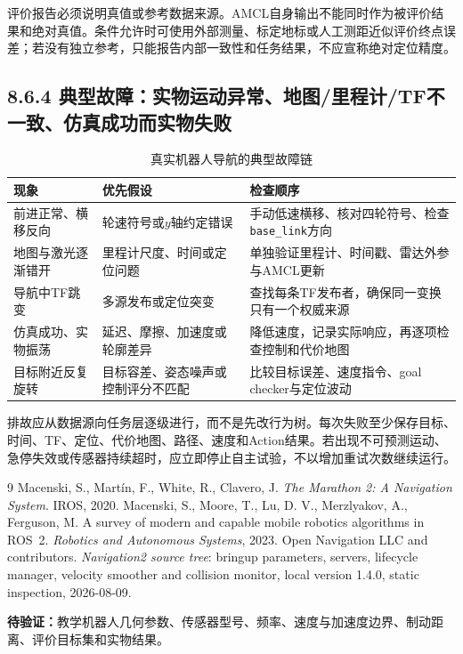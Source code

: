 \documentclass[UTF8,zihao=-4]{ctexart}
\begin{document}
评价报告必须说明真值或参考数据来源。AMCL自身输出不能同时作为被评价结果和绝对真值。条件允许时可使用外部测量、标定地标或人工测距近似评价终点误差；若没有独立参考，只能报告内部一致性和任务结果，不应宣称绝对定位精度。

\subsection*{8.6.4 典型故障：实物运动异常、地图/里程计/TF不一致、仿真成功而实物失败}

\begin{table}[htbp]
  \centering
  \caption{真实机器人导航的典型故障链}
  \begin{tabular}{p{}p{}p{}}
    \toprule
    现象 & 优先假设 & 检查顺序 \\
    \midrule
    前进正常、横移反向 & 轮速符号或$y$轴约定错误 & 手动低速横移、核对四轮符号、检查\texttt{base\_link}方向 \\
    地图与激光逐渐错开 & 里程计尺度、时间或定位问题 & 单独验证里程计、时间戳、雷达外参与AMCL更新 \\
    导航中TF跳变 & 多源发布或定位突变 & 查找每条TF发布者，确保同一变换只有一个权威来源 \\
    仿真成功、实物振荡 & 延迟、摩擦、加速度或轮廓差异 & 降低速度，记录实际响应，再逐项检查控制和代价地图 \\
    目标附近反复旋转 & 目标容差、姿态噪声或控制评分不匹配 & 比较目标误差、速度指令、goal checker与定位波动 \\
    \bottomrule
  \end{tabular}
\end{table}

排故应从数据源向任务层逐级进行，而不是先改行为树。每次失败至少保存目标、时间、TF、定位、代价地图、路径、速度和Action结果。若出现不可预测运动、急停失效或传感器持续超时，应立即停止自主试验，不以增加重试次数继续运行。

\begin{thebibliography}{9}
 Macenski, S., Martín, F., White, R., Clavero, J. \emph{The Marathon 2: A Navigation System}. IROS, 2020.
 Macenski, S., Moore, T., Lu, D. V., Merzlyakov, A., Ferguson, M. A survey of modern and capable mobile robotics algorithms in ROS~2. \emph{Robotics and Autonomous Systems}, 2023.
 Open Navigation LLC and contributors. \emph{Navigation2 source tree}: bringup parameters, servers, lifecycle manager, velocity smoother and collision monitor, local version 1.4.0, static inspection, 2026-08-09.
\end{thebibliography}

\noindent\textbf{待验证：}教学机器人几何参数、传感器型号、频率、速度与加速度边界、制动距离、评价目标集和实物结果。
\end{document}
